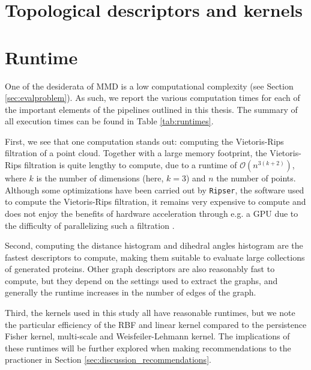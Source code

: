 \section{Topological descriptors and kernels}

\section{Runtime}\label{sec:results_runtime}

One of the desiderata of MMD is a low computational complexity (see Section
\ref{sec:evalproblem}). As such, we report the various computation times for
each of the important elements of the pipelines outlined in this thesis. The
summary of all execution times can be found in Table \ref{tab:runtimes}.

First, we see that one computation stands out: computing the Vietoris-Rips
filtration of a point cloud. Together with a large memory footprint, the
Vietoris-Rips filtration is quite lengthy to compute, due to a runtime of
$\mathcal{O}(n^{3(k+2)})$, where $k$ is the number of dimensions (here, $k=3$)
and $n$ the number of points. Although some optimizations have been carried out
by \texttt{Ripser}, the software used to compute the Vietoris-Rips filtration,
it remains very expensive to compute and does not enjoy the benefits of hardware
acceleration through e.g. a GPU due to the difficulty of parallelizing such a
filtration \cite{Bauer2021Ripser}.

Second, computing the distance histogram and dihedral angles histogram are the
fastest descriptors to compute, making them suitable to evaluate large
collections of generated proteins. Other graph descriptors are also reasonably
fast to compute, but they depend on the settings used to extract the graphs, and
generally the runtime increases in the number of edges of the graph.

Third, the kernels used in this study all have reasonable runtimes, but we note
the particular efficiency of the RBF and linear kernel compared to the
persistence Fisher kernel, multi-scale and Weisfeiler-Lehmann kernel. The
implications of these runtimes will be further explored when making
recommendations to the practioner in Section
\ref{sec:discussion_recommendations}.



